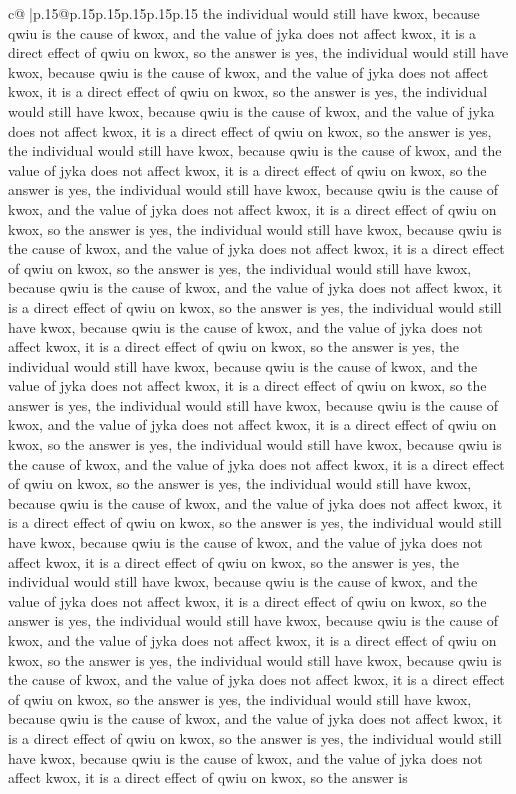 \documentclass{article}
\begin{document}
{\begin{supertabular}{c@{$\;$}|p{.15\linewidth}@{}p{.15\linewidth}p{.15\linewidth}p{.15\linewidth}p{.15\linewidth}p{.15\linewidth}}
{{{the individual would still have kwox, because qwiu is the cause of kwox, and the value of jyka does not affect kwox, it is a direct effect of qwiu on kwox, so the answer is yes, the individual would still have kwox, because qwiu is the cause of kwox, and the value of jyka does not affect kwox, it is a direct effect of qwiu on kwox, so the answer is yes, the individual would still have kwox, because qwiu is the cause of kwox, and the value of jyka does not affect kwox, it is a direct effect of qwiu on kwox, so the answer is yes, the individual would still have kwox, because qwiu is the cause of kwox, and the value of jyka does not affect kwox, it is a direct effect of qwiu on kwox, so the answer is yes, the individual would still have kwox, because qwiu is the cause of kwox, and the value of jyka does not affect kwox, it is a direct effect of qwiu on kwox, so the answer is yes, the individual would still have kwox, because qwiu is the cause of kwox, and the value of jyka does not affect kwox, it is a direct effect of qwiu on kwox, so the answer is yes, the individual would still have kwox, because qwiu is the cause of kwox, and the value of jyka does not affect kwox, it is a direct effect of qwiu on kwox, so the answer is yes, the individual would still have kwox, because qwiu is the cause of kwox, and the value of jyka does not affect kwox, it is a direct effect of qwiu on kwox, so the answer is yes, the individual would still have kwox, because qwiu is the cause of kwox, and the value of jyka does not affect kwox, it is a direct effect of qwiu on kwox, so the answer is yes, the individual would still have kwox, because qwiu is the cause of kwox, and the value of jyka does not affect kwox, it is a direct effect of qwiu on kwox, so the answer is yes, the individual would still have kwox, because qwiu is the cause of kwox, and the value of jyka does not affect kwox, it is a direct effect of qwiu on kwox, so the answer is yes, the individual would still have kwox, because qwiu is the cause of kwox, and the value of jyka does not affect kwox, it is a direct effect of qwiu on kwox, so the answer is yes, the individual would still have kwox, because qwiu is the cause of kwox, and the value of jyka does not affect kwox, it is a direct effect of qwiu on kwox, so the answer is yes, the individual would still have kwox, because qwiu is the cause of kwox, and the value of jyka does not affect kwox, it is a direct effect of qwiu on kwox, so the answer is yes, the individual would still have kwox, because qwiu is the cause of kwox, and the value of jyka does not affect kwox, it is a direct effect of qwiu on kwox, so the answer is yes, the individual would still have kwox, because qwiu is the cause of kwox, and the value of jyka does not affect kwox, it is a direct effect of qwiu on kwox, so the answer is yes, the individual would still have kwox, because qwiu is the cause of kwox, and the value of jyka does not affect kwox, it is a direct effect of qwiu on kwox, so the answer is yes, the individual would still have kwox, because qwiu is the cause of kwox, and the value of jyka does not affect kwox, it is a direct effect of qwiu on kwox, so the answer is }}}
\end{supertabular}}
\end{document}
